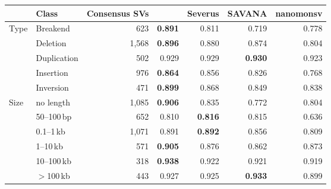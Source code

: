 \begin{tabular}{llrrrrr}
\toprule
 & Class & Consensus SVs & \tool{} & Severus & SAVANA & nanomonsv \\
\midrule
Type & Breakend & 623 & \textbf{0.891} & 0.811 & 0.719 & 0.778 \\
 & Deletion & 1,568 & \textbf{0.896} & 0.880 & 0.874 & 0.804 \\
 & Duplication & 502 & 0.929 & 0.929 & \textbf{0.930} & 0.923 \\
 & Insertion & 976 & \textbf{0.864} & 0.856 & 0.826 & 0.768 \\
 & Inversion & 471 & \textbf{0.899} & 0.868 & 0.849 & 0.838 \\
\midrule
Size & no length & 1,085 & \textbf{0.906} & 0.835 & 0.772 & 0.804 \\
 & 50--100\,bp & 652 & 0.810 & \textbf{0.816} & 0.815 & 0.636 \\
 & 0.1--1\,kb & 1,071 & 0.891 & \textbf{0.892} & 0.856 & 0.809 \\
 & 1--10\,kb & 571 & \textbf{0.905} & 0.876 & 0.862 & 0.873 \\
 & 10--100\,kb & 318 & \textbf{0.938} & 0.922 & 0.921 & 0.919 \\
 & $>$100\,kb & 443 & 0.927 & 0.925 & \textbf{0.933} & 0.899 \\
\bottomrule
\end{tabular}
